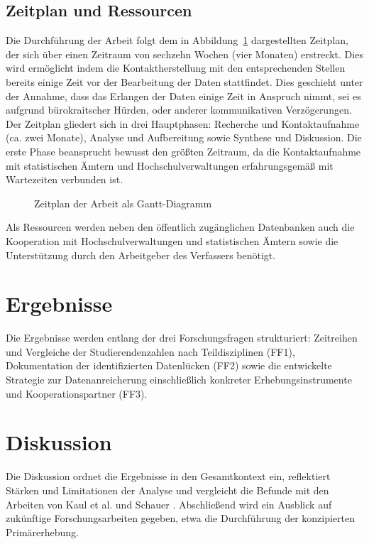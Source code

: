 \subsection{Zeitplan und Ressourcen}

Die Durchführung der Arbeit folgt dem in Abbildung~\ref{fig:gantt} dargestellten Zeitplan, der sich über einen Zeitraum von sechzehn Wochen (vier Monaten) erstreckt. Dies wird ermöglicht indem die Kontaktherstellung mit den entsprechenden Stellen   bereits einige Zeit vor der Bearbeitung der Daten stattfindet. Dies geschieht unter der Annahme, dass das Erlangen der Daten einige Zeit in Anspruch nimmt, sei es aufgrund bürokraitscher Hürden, oder anderer kommunikativen Verzögerungen. Der Zeitplan gliedert sich in drei Hauptphasen: Recherche und Kontaktaufnahme (ca. zwei Monate), Analyse und Aufbereitung sowie Synthese und Diskussion. Die erste Phase beansprucht bewusst den größten Zeitraum, da die Kontaktaufnahme mit statistischen Ämtern und Hochschulverwaltungen erfahrungsgemäß mit Wartezeiten verbunden ist.

\begin{figure}[ht]
    \centering
    \resizebox{\textwidth}{!}{
        
    }
    \caption{Zeitplan der Arbeit als Gantt-Diagramm}
    \label{fig:gantt}
\end{figure}

Als Ressourcen werden neben den öffentlich zugänglichen Datenbanken auch die Kooperation mit Hochschulverwaltungen und statistischen Ämtern sowie die Unterstützung durch den Arbeitgeber des Verfassers benötigt.

\section{Ergebnisse}

Die Ergebnisse werden entlang der drei Forschungsfragen strukturiert: Zeitreihen und Vergleiche der Studierendenzahlen nach Teildisziplinen (FF1), Dokumentation der identifizierten Datenlücken (FF2) sowie die entwickelte Strategie zur Datenanreicherung einschließlich konkreter Erhebungsinstrumente und Kooperationspartner (FF3).

\section{Diskussion}

Die Diskussion ordnet die Ergebnisse in den Gesamtkontext ein, reflektiert Stärken und Limitationen der Analyse und vergleicht die Befunde mit den Arbeiten von Kaul et al. \cite{kaulKarrierestart2016} und Schauer \cite{schauerWirtschaftsinformatik2021}. Abschließend wird ein Ausblick auf zukünftige Forschungsarbeiten gegeben, etwa die Durchführung der konzipierten Primärerhebung.

